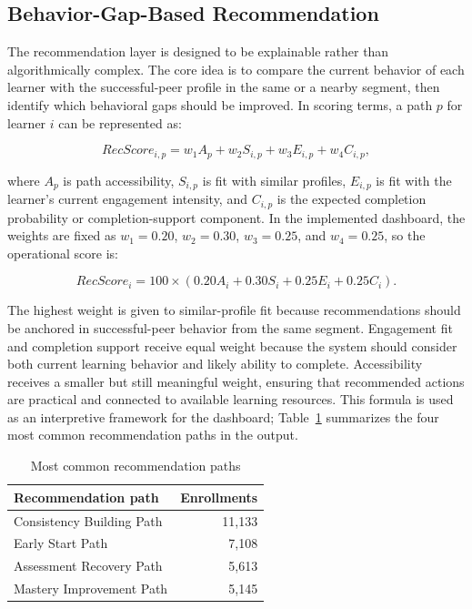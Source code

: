 \documentclass[conference]{IEEEtran}
\begin{document}
\subsection{Behavior-Gap-Based Recommendation}

The recommendation layer is designed to be explainable rather than algorithmically complex. The core idea is to compare the current behavior of each learner with the successful-peer profile in the same or a nearby segment, then identify which behavioral gaps should be improved. In scoring terms, a path \(p\) for learner \(i\) can be represented as:

\begin{equation}
RecScore_{i,p} = w_1 A_{p} + w_2 S_{i,p} + w_3 E_{i,p} + w_4 C_{i,p},
\end{equation}

where \(A_p\) is path accessibility, \(S_{i,p}\) is fit with similar profiles, \(E_{i,p}\) is fit with the learner's current engagement intensity, and \(C_{i,p}\) is the expected completion probability or completion-support component. In the implemented dashboard, the weights are fixed as \(w_1=0.20\), \(w_2=0.30\), \(w_3=0.25\), and \(w_4=0.25\), so the operational score is:

\begin{equation}
RecScore_i = 100 \times (0.20A_i + 0.30S_i + 0.25E_i + 0.25C_i).
\end{equation}

The highest weight is given to similar-profile fit because recommendations should be anchored in successful-peer behavior from the same segment. Engagement fit and completion support receive equal weight because the system should consider both current learning behavior and likely ability to complete. Accessibility receives a smaller but still meaningful weight, ensuring that recommended actions are practical and connected to available learning resources. This formula is used as an interpretive framework for the dashboard; Table~\ref{tab:paths} summarizes the four most common recommendation paths in the output.

\begin{table}[H]
\centering
\footnotesize
\caption{Most common recommendation paths}
\label{tab:paths}
\begin{tabular}{lr}
\toprule
Recommendation path & Enrollments \\
\midrule
Consistency Building Path & 11,133 \\
Early Start Path & 7,108 \\
Assessment Recovery Path & 5,613 \\
Mastery Improvement Path & 5,145 \\
\bottomrule
\end{tabular}
\end{table}
\end{document}
